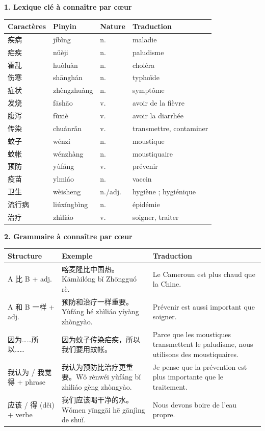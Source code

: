 \documentclass[11pt]{article}
\begin{document}
\begin{bilan}
\textbf{1. Lexique clé à connaître par cœur}
\begin{center}
\begin{tabularx}{\linewidth}{|X|X|X|X|}
\hline
\rowcolor{popblueL} Caractères & Pinyin & Nature & Traduction \\
\hline
疾病 & jíbìng & n. & maladie \\
\hline
疟疾 & nüèji & n. & paludisme \\
\hline
霍乱 & huòluàn & n. & choléra \\
\hline
伤寒 & shānghán & n. & typhoïde \\
\hline
症状 & zhèngzhuàng & n. & symptôme \\
\hline
发烧 & fāshāo & v. & avoir de la fièvre \\
\hline
腹泻 & fùxiè & v. & avoir la diarrhée \\
\hline
传染 & chuánrǎn & v. & transmettre, contaminer \\
\hline
蚊子 & wénzi & n. & moustique \\
\hline
蚊帐 & wénzhàng & n. & moustiquaire \\
\hline
预防 & yùfáng & v. & prévenir \\
\hline
疫苗 & yìmiáo & n. & vaccin \\
\hline
卫生 & wèishēng & n./adj. & hygiène ; hygiénique \\
\hline
流行病 & liúxíngbìng & n. & épidémie \\
\hline
治疗 & zhìliáo & v. & soigner, traiter \\
\hline
\end{tabularx}
\end{center}

\textbf{2. Grammaire à connaître par cœur}
\begin{center}
\begin{tabularx}{\linewidth}{|X|X|X|}
\hline
\rowcolor{popblueL} Structure & Exemple & Traduction \\
\hline
A 比 B + adj. & 喀麦隆比中国热。Kāmàilóng bǐ Zhōngguó rè. & Le Cameroun est plus chaud que la Chine. \\
\hline
A 和 B 一样 + adj. & 预防和治疗一样重要。Yùfáng hé zhìliáo yíyàng zhòngyào. & Prévenir est aussi important que soigner. \\
\hline
因为……所以…… & 因为蚊子传染疟疾，所以我们要用蚊帐。 & Parce que les moustiques transmettent le paludisme, nous utilisons des moustiquaires. \\
\hline
我认为 / 我觉得 + phrase & 我认为预防比治疗更重要。Wǒ rènwéi yùfáng bǐ zhìliáo gèng zhòngyào. & Je pense que la prévention est plus importante que le traitement. \\
\hline
应该 / 得 (děi) + verbe & 我们应该喝干净的水。Wǒmen yīnggāi hē gānjìng de shuǐ. & Nous devons boire de l'eau propre. \\
\hline
\end{tabularx}
\end{center}


\end{bilan}
\end{document}

